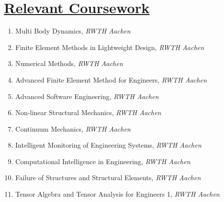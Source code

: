 \section{\underline{Relevant Coursework}}
\begin{enumerate}
\item Multi Body Dynamics, \emph{RWTH Aachen}
\item Finite Element Methods in Lightweight Design, \emph{RWTH Aachen}
\item Numerical Methods, \emph{RWTH Aachen}
\item Advanced Finite Element Method for Engineers, \emph{RWTH Aachen}
\item Advanced Software Engineering, \emph{RWTH Aachen}
\item Non-linear Structural Mechanics, \emph{RWTH Aachen}
\item Continuum Mechanics, \emph{RWTH Aachen}
\item Intelligent Monitoring of Engineering Systems, \emph{RWTH Aachen}
\item Computational Intelligence in Engineering, \emph{RWTH Aachen}
\item Failure of Structures and Structural Elements, \emph{RWTH Aachen}
\item Tensor Algebra and Tensor Analysis for Engineers 1, \emph{RWTH Aachen}
\end{enumerate}